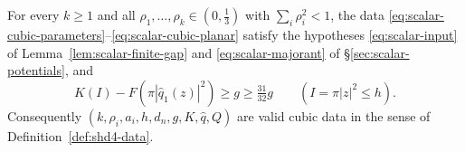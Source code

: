 \begin{proposition}\label{prop:scalar-cubic-data}
For every $k\ge1$ and all $\rho_1,\dots,\rho_k\in(0,\frac13)$ with $\sum_i\rho_i^2<1$, the data
\eqref{eq:scalar-cubic-parameters}--\eqref{eq:scalar-cubic-planar} satisfy the hypotheses \eqref{eq:scalar-input} of
Lemma~\ref{lem:scalar-finite-gap} and \eqref{eq:scalar-majorant} of \S\ref{sec:scalar-potentials}, and
\begin{equation}\label{eq:scalar-cubic-gap}
 K(I)-F(\pi|\widehat q_1(z)|^2)\ge g\ge\tfrac{31}{32}g\qquad(I=\pi|z|^2\le h).
\end{equation}
Consequently $(k,\rho_i,a_i,h,d_n,g,K,\widehat q,Q)$ are valid cubic data in the sense of Definition~\ref{def:shd4-data}.
{\normalfont {}}
\end{proposition}

